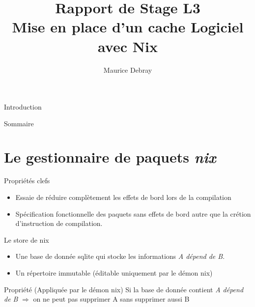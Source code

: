 \documentclass{beamer}
\title{Rapport de Stage L3\\Mise en place d'un cache Logiciel avec Nix}
\author{Maurice Debray}
\date{}
\begin{document}
\begin{frame}
  \maketitle
\end{frame}

\begin{frame}{Introduction}
\end{frame}

\begin{frame}{Sommaire}
  \tableofcontents
\end{frame}

\section{Le gestionnaire de paquets \emph{nix}}

\begin{frame}{Propriétés clefs}
	\begin{itemize}
		\item Essaie de réduire complètement les effets de bord lors de la compilation
		\item Spécification fonctionnelle des paquets sans effets de bord autre que la crétion d'instruction de compilation.
	\end{itemize}

\end{frame}

\begin{frame}{Le store de nix}

\begin{itemize}
	\item Une base de donnée sqlite qui stocke les informations \og{}\emph{A dépend de B}\fg{}.
	\item Un répertoire immutable (éditable uniquement par le démon nix)
\end{itemize}


\begin{block}{Propriété (Appliquée par le démon nix)}
	Si la base de donnée contient \og{}\emph{A dépend de B}\fg{} $\Rightarrow$ on ne peut pas supprimer A sans supprimer aussi B
\end{block}
\end{frame}
\end{document}

